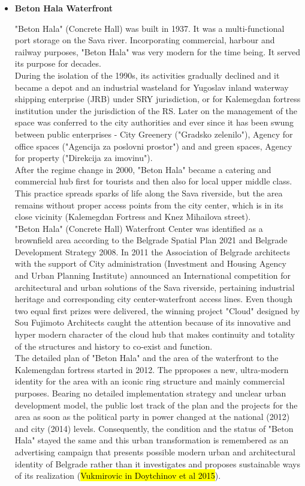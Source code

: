 \documentclass[11pt]{report}
\begin{document}
\begin{itemize}
\item \textbf{Beton Hala Waterfront}

"Beton Hala" (Concrete Hall) was built in 1937. It was a multi-functional port storage on the Sava river. Incorporating commercial, harbour and railway purposes, "Beton Hala" was very modern for the time being. It served its purpose for decades.
\\
During the isolation of the 1990s, its activities gradually declined and it became a depot and an industrial wasteland for Yugoslav inland waterway shipping enterprise (JRB) under SRY jurisdiction, or for Kalemegdan fortress institution under the jurisdiction of the RS.
Later on the management of the space was conferred to the city authorities and ever since it has been swung between public enterprises - City Greenery ("Gradsko zelenilo"), Agency for office spaces ("Agencija za poslovni prostor") and and green spaces, Agency for property ("Direkcija za imovinu").
\\
After the regime change in 2000, "Beton Hala" became a catering and commercial hub first for tourists and then also for local upper middle class. This practice spreads sparks of life along the Sava riverside, but the area remains without proper access points from the city center, which is in its close vicinity (Kalemegdan Fortress and Knez Mihailova street).
\\
"Beton Hala" (Concrete Hall) Waterfront Center was identified as a brownfield area according to the Belgrade Spatial Plan 2021 and Belgrade Development Strategy 2008. In 2011 the Association of Belgrade architects with the support of City administration (Investment and Housing Agency and Urban Planning Institute) announced an International competition for architectural and urban solutions of the Sava riverside, pertaining industrial heritage and corresponding city center-waterfront access lines.
Even though two equal first prizes were delivered, the winning project "Cloud"  designed  by  Sou  Fujimoto  Architects caught the attention because of its innovative and hyper modern character of the cloud hub that makes continuity and totality of the structures and history to co-exist and function.
\\
The detailed plan of "Beton Hala"  and the area of the waterfront to the Kalemengdan fortress started  in 2012. The pproposes a new, ultra-modern identity for the area with an iconic ring structure and mainly commercial purposes.
Bearing no detailed implementation strategy and unclear urban development model, the public lost track of the plan and the projects for the area as soon as the political party in power changed at the national (2012) and city (2014) levels.
Consequently, the condition and the status of "Beton Hala" stayed the same and this urban transformation is remembered as an advertising campaign that presents possible modern urban and architectural identity of Belgrade rather than it investigates and proposes sustainable ways of its realization (\hl{Vukmirovic in Doytchinov et al 2015}).


\end{itemize}
\end{document}
